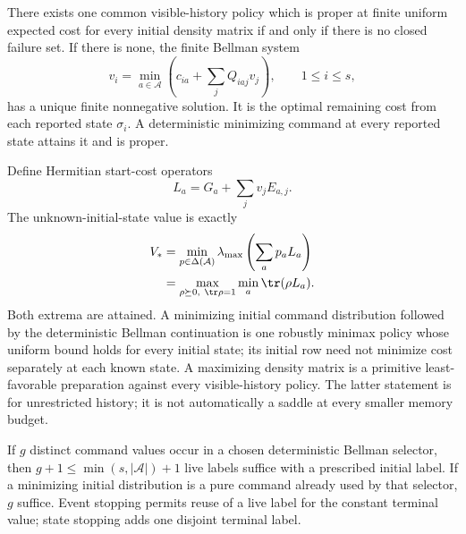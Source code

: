 \begin{theorem}\label{thm:reset-control}
There exists one common visible-history policy which is proper at finite uniform expected cost for every initial density matrix if and only if there is no closed failure set. If there is none, the finite Bellman system
\begin{equation}\label{eq:reset-bellman}
 v_i=\min_{a\in\mathcal A}\left(c_{ia}+\sum_jQ_{iaj}v_j\right),\qquad 1\le i\le s,
\end{equation}
has a unique finite nonnegative solution. It is the optimal remaining cost from each reported state $\sigma_i$. A deterministic minimizing command at every reported state attains it and is proper.

Define Hermitian start-cost operators
\[
 L_a=G_a+\sum_jv_jE_{a,j}.
\]
The unknown-initial-state value is exactly
\begin{align}
 V_*&=\min_{p\in\Delta(\mathcal A)}\lambda_{\max}\left(\sum_a p_a L_a\right)\label{eq:reset-sdp}\\
 &=\max_{\rho\succeq0,\ \tr\rho=1}\min_a\tr(\rho L_a).\label{eq:reset-dual}
\end{align}
Both extrema are attained. A minimizing initial command distribution followed by the deterministic Bellman continuation is one robustly minimax policy whose uniform bound holds for every initial state; its initial row need not minimize cost separately at each known state. A maximizing density matrix is a primitive least-favorable preparation against every visible-history policy. The latter statement is for unrestricted history; it is not automatically a saddle at every smaller memory budget.

If $g$ distinct command values occur in a chosen deterministic Bellman selector, then $g+1\le\min(s,|\mathcal A|)+1$ live labels suffice with a prescribed initial label. If a minimizing initial distribution is a pure command already used by that selector, $g$ suffice. Event stopping permits reuse of a live label for the constant terminal value; state stopping adds one disjoint terminal label.
\end{theorem}
